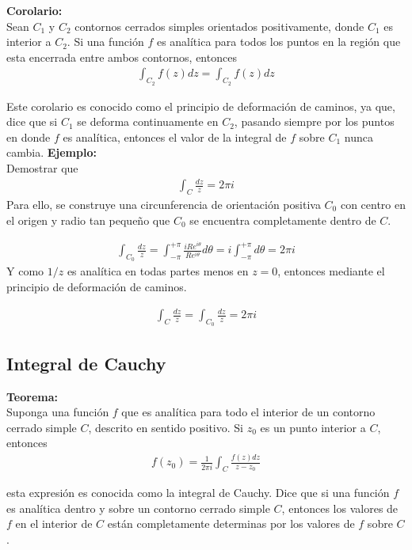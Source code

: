 \begin{mdframed}
    \textbf{Corolario:}\\
    Sean $C_1$ y $C_2$ contornos cerrados simples orientados positivamente, donde $C_1$ es interior a $C_2$. Si una función $f$ es analítica para todos los puntos en la región que esta encerrada entre ambos contornos, entonces 
    \begin{gather*}
        \int_{C_2} f(z)dz = \int_{C_2}f(z)dz
     \end{gather*}
\end{mdframed}
Este corolario es conocido como el principio de deformación de caminos, ya que, dice que si $C_1$ se deforma continuamente en $C_2$, pasando siempre por los puntos en donde $f$ es analítica, entonces el valor de la integral de $f$ sobre $C_1$ nunca cambia.\newline
\textbf{Ejemplo:}\\
Demostrar que 
\begin{gather*}
    \int_C \frac{dz}{z} = 2\pi i
\end{gather*}
Para ello, se construye una circunferencia de orientación positiva $C_0$ con centro en el origen y radio tan pequeño que $C_0$ se encuentra completamente dentro de $C$.

\begin{gather*}
    \int_{C_0} \frac{dz}{z} = \int_{-\pi}^{+\pi}\frac{iRe^{i\theta}}{Re^{i\theta}}d\theta = i\int_{-\pi}^{+\pi}d\theta = 2\pi i
\end{gather*}
Y como $1/z$ es analítica en todas partes menos en $z=0$, entonces mediante el principio de deformación de caminos.

\begin{gather*}
    \int_C \frac{dz}{z} = \int_{C_0} \frac{dz}{z} = 2\pi i
\end{gather*}

\subsection{Integral de Cauchy}
\begin{mdframed}
    \textbf{Teorema:}\\
    Suponga una función $f$ que es analítica para todo el interior de un contorno cerrado simple $C$, descrito en sentido positivo. Si $z_0$ es un punto interior a $C$, entonces
    \begin{gather*}
        f(z_0) = \frac{1}{2\pi i }\int_C \frac{f(z)dz}{z-z_0}
    \end{gather*}
\end{mdframed}
esta expresión es conocida como la integral de Cauchy. Dice que si una función $f$ es analítica dentro y sobre un contorno cerrado simple $C$, entonces los valores de $f$  en el interior de $C$ están completamente determinas por los valores de $f$ sobre $C$.

